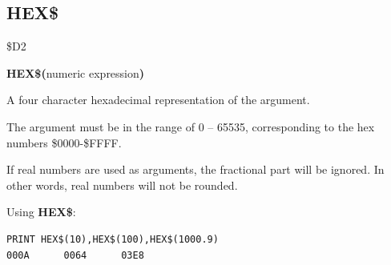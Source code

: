 \subsection{HEX\$}
\begin{description}[leftmargin=2cm,style=nextline]
\item [Token:] \$D2
\item [Format:] {\bf HEX\$(}numeric expression{\bf)}
\item [Returns:] A four character hexadecimal
               representation of the argument.

               The argument must be in the range of 0 -- 65535,
               corresponding to the hex numbers \$0000-\$FFFF.

\item [Remarks:] If real numbers are used as arguments, the
                 fractional part will be ignored. In other words, real numbers
                 will not be rounded.

\item [Example:] Using {\bf HEX\$}:
\begin{tcolorbox}[colback=black,coltext=white]
\verbatimfont{\codefont}
\begin{verbatim}
PRINT HEX$(10),HEX$(100),HEX$(1000.9)
000A      0064      03E8
\end{verbatim}
\end{tcolorbox}
\end{description}


\newpage
